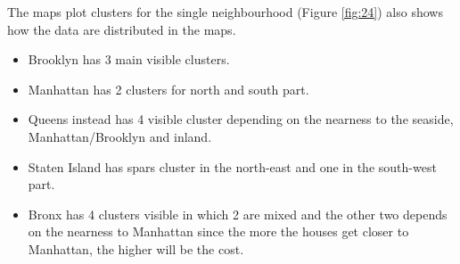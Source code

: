 \documentclass{FR16}
\begin{document}
\newpage
\noindent The maps plot clusters for the single neighbourhood (Figure \ref{fig:24}) also shows how the data are distributed  in the maps. 
\begin{itemize}
\itemsep0em 
\item Brooklyn has 3 main visible clusters.
\item Manhattan has 2 clusters for north and south part. 
\item Queens instead has 4 visible cluster depending on the nearness to the seaside, Manhattan/Brooklyn and inland. 
\item Staten Island has spars cluster in the north-east and one in the south-west part.
\item Bronx has 4 clusters visible in which 2 are mixed and the other two depends on the nearness to Manhattan since the more the houses get closer to Manhattan, the higher will be the cost.
\end{itemize}
\end{document}
